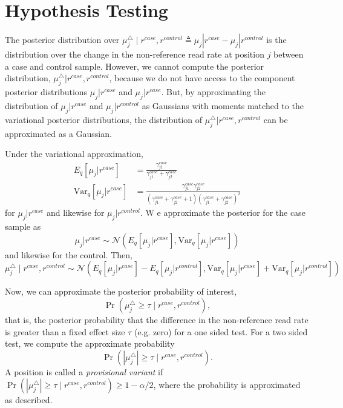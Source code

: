\documentclass[11pt,reqno]{amsart}
\begin{document}
\section{Hypothesis Testing}
The posterior distribution over $\mu_j^{\triangle} \mid r^{case}, r^{control} \triangleq \mu_j|r^{case} - \mu_j|r^{control}$ is the distribution over the change in the non-reference read rate at position $j$ between a case and control sample.
However, we cannot compute the posterior distribution, $\mu_j^{\triangle} | r^{case}, r^{control}$, because we do not have access to the component posterior distributions $\mu_j|r^{case}$ and $\mu_j|r^{case}$.
But, by approximating the distribution of $\mu_j|r^{case}$ and $\mu_j|r^{control}$ as Gaussians with moments matched to the variational posterior distributions, the distribution of $\mu_j^{\triangle} | r^{case}, r^{control}$ can be approximated as a Gaussian.

Under the variational approximation,
\begin{align}
  E_q[\mu_j|r^{case}] &= \frac{\gamma_{j1}^{case}}{\gamma_{j1}^{case} + \gamma_{j2}^{case}}
  \\
  \text{Var}_q[\mu_j|r^{case}] &= \frac{\gamma_{j1}^{case} \gamma_{j2}^{case}}{(\gamma_{j1}^{case} + \gamma_{j2}^{case} + 1)(\gamma_{j1}^{case} + \gamma_{j2}^{case})^2}
\end{align}
for $\mu_j|r^{case}$ and likewise for $\mu_j|r^{control}$.
W e approximate the posterior for the case sample as
\begin{equation}
  \mu_j | r^{case} \sim \mathcal{N}(E_q[\mu_j|r^{case}], \text{Var}_q[\mu_j|r^{case}])
\end{equation}
and likewise for the control.
Then,
\begin{equation}
  \mu_j^{\triangle} \mid r^{case}, r^{control} \sim \mathcal{N}(E_q[\mu_j|r^{case}] - E_q[\mu_j|r^{control}], \text{Var}_q[\mu_j|r^{case}] + \text{Var}_q[\mu_j|r^{control}])
\end{equation}

Now, we can approximate the posterior probability of interest,
\begin{equation}
  \Pr( \mu_j^{\triangle} \geq \tau \mid r^{case}, r^{control} ),
\end{equation}
that is, the posterior probability that the difference in the non-reference read rate is greater than a fixed effect size $\tau$ (e.g. zero) for a one sided test.
For a two sided test, we compute the approximate probability
\begin{equation}
  \Pr( | \mu_j^{\triangle} | \geq \tau \mid r^{case}, r^{control}).
\end{equation}
A position is called a \textit{provisional variant} if $\Pr( | \mu_j^{\triangle} | \geq \tau \mid r^{case}, r^{control}) \geq 1-\alpha/2$, where the probability is approximated as described.
\end{document}
